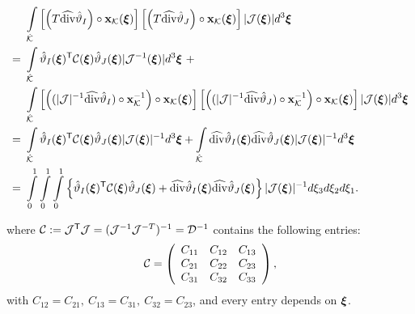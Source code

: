 \begin{align}
                                        \ & \int\limits_{\hat{\mathcal{K}}}
                                        \left[\left(T\widehat{\operatorname{div}}\hat{\vartheta}_I\right)\circ\mathbf{x}_{\mathcal{K}}(\boldsymbol{\xi})\right] \left[\left(T\widehat{\operatorname{div}}\hat{\vartheta}_J\right)\circ\mathbf{x}_{\mathcal{K}}(\boldsymbol{\xi})\right]|\mathcal{J}(\boldsymbol{\xi})|d^3\boldsymbol{\xi} \nonumber\\ 
                                        =\ & \int\limits_{\hat{\mathcal{K}}}
                                        \hat{\vartheta}_I(\boldsymbol{\xi})^{\mathsf{T}}\mathcal{C}(\boldsymbol{\xi})\hat{\vartheta}_J(\boldsymbol{\xi})|\mathcal{J}^{-1}(\boldsymbol{\xi})|d^3\boldsymbol{\xi} \ +\nonumber\\*
                                        \ & \int\limits_{\hat{\mathcal{K}}}
                                        \left[\left((|\mathcal{J}|^{-1}\widehat{\operatorname{div}}\hat{\vartheta}_I)\circ\mathbf{x}_{\mathcal{K}}^{-1}\right)\circ\mathbf{x}_{\mathcal{K}}(\boldsymbol{\xi})\right] \left[\left((|\mathcal{J}|^{-1}\widehat{\operatorname{div}}\hat{\vartheta}_J)\circ\mathbf{x}_{\mathcal{K}}^{-1}\right)\circ\mathbf{x}_{\mathcal{K}}(\boldsymbol{\xi})\right]|\mathcal{J}(\boldsymbol{\xi})|d^3\boldsymbol{\xi} \nonumber\\ 
                                        =\ & \int\limits_{\hat{\mathcal{K}}}
                                        \hat{\vartheta}_I(\boldsymbol{\xi})^{\mathsf{T}}\mathcal{C}(\boldsymbol{\xi})\hat{\vartheta}_J(\boldsymbol{\xi})|\mathcal{J}(\boldsymbol{\xi})|^{-1}d^3\boldsymbol{\xi} +
                                        \int\limits_{\hat{\mathcal{K}}}             \widehat{\operatorname{div}}\hat{\vartheta}_I(\boldsymbol{\xi})\widehat{\operatorname{div}}\hat{\vartheta}_J(\boldsymbol{\xi})|\mathcal{J}(\boldsymbol{\xi})|^{-1}d^3\boldsymbol{\xi} \nonumber \\ 
                                        =\ & \int\limits_0^1\int\limits_0^1\int\limits_0^1\left\{\hat{\vartheta}_I(\boldsymbol{\xi})^{\mathsf{T}}\mathcal{C}(\boldsymbol{\xi})\hat{\vartheta}_J(\boldsymbol{\xi})+\widehat{\operatorname{div}}\hat{\vartheta}_I(\boldsymbol{\xi})\widehat{\operatorname{div}}\hat{\vartheta}_J(\boldsymbol{\xi})\right\}|\mathcal{J}(\boldsymbol{\xi})|^{-1}d\xi_3d\xi_2d\xi_1.
    \label{hdivip_coupled}
\end{align}

\noindent where $\mathcal{C}:=\mathcal{J}^{\mathsf{T}}\mathcal{J}=(\mathcal{J}^{-1}\mathcal{J}^{-T})^{-1}=\mathcal{D}^{-1}$ contains the following entries:
% 
\begin{equation}
    \mathcal{C}=\left(
    \begin{array}{ccc}
         C_{11} & C_{12} & C_{13}  \\
         C_{21} & C_{22} & C_{23}  \\
         C_{31} & C_{32} & C_{33}
    \end{array}\right),
    \label{def_C}
\end{equation}
% 
with $C_{12}=C_{21},\ C_{13}=C_{31},\ C_{32}=C_{23}$, and every entry depends on $\boldsymbol{\xi}$.

